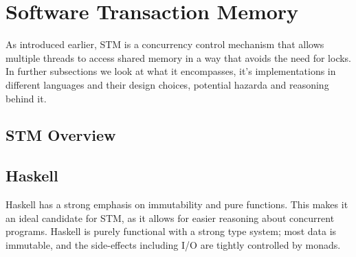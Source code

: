 \section{Software Transaction Memory\label{sec:stm}}
As introduced earlier, STM is a concurrency control mechanism that allows multiple threads to access shared memory in a way that avoids the need for locks. In further subsections we look at what it encompasses, it's implementations in different languages and their design choices, potential hazarda and reasoning behind it.

\subsection {STM Overview}

\subsection{Haskell}
Haskell has a strong emphasis on immutability and pure functions. This makes it an ideal candidate for STM, as it allows for easier reasoning about concurrent programs.  Haskell is purely functional with a strong type system; most data is immutable, and the side-effects including I/O are tightly controlled by monads. 

